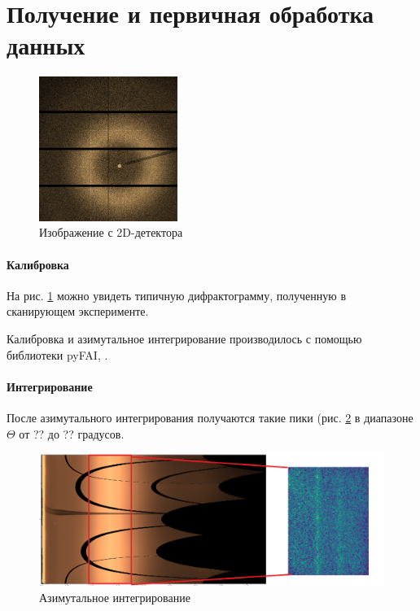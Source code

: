 	\section{Получение и первичная обработка данных}
	
	\begin{figure}
\vspace{-12px}
  \begin{center}
    \includegraphics[width=0.4\textwidth]{fig/obj.png}
    \vspace{3px}
    \caption{Изображение с 2D-детектора}
    \label{fig:difractogram}
  \end{center}
\end{figure}
	
	
	\paragraph{Калибровка}
На рис. \ref{fig:difractogram} можно увидеть типичную дифрактограмму, полученную в сканирующем эксперименте. 

Калибровка и азимутальное интегрирование производилось с помощью библиотеки pyFAI, \cite{pyfai}.

\paragraph{Интегрирование}

После азимутального интегрирования получаются такие пики (рис. \ref{fig:azim} в диапазоне $\Theta$ от ?? до ?? градусов. 

\begin{figure}[t]
    \centering
    \includegraphics[width=\linewidth]{fig/azim.png}
    \caption{Азимутальное интегрирование}
    \label{fig:azim}
\end{figure}


